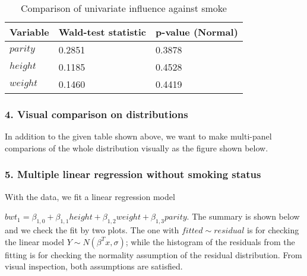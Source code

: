 \documentclass{article}
\begin{document}
\begin{table}
\caption{Comparison of univariate influence against smoke} \label{tab:title}
\begin{center}
\begin{tabular}{|l|l|l|}
Variable & Wald-test statistic & p-value (Normal) \\ \hline
{$parity$} & 0.2851 & 0.3878 \\ 
{$height$} & 0.1185 & 0.4528 \\ 
{$weight$} & 0.1460 & 0.4419 \\ 
\end{tabular}
\end{center}
\end{table}


\subsubsection*{4. Visual comparison on distributions}
\hspace{12 pt} In addition to the given table shown above, we want to
make multi-panel comparions of the whole distribution visually as the
figure shown below. 


\subsubsection*{5. Multiple linear regression without smoking status}
\hspace{12 pt} With the data, we fit a linear regression model


\hspace{24 pt}
$bwt_1 = \beta_{1,0} + \beta_{1,1}height + \beta_{1,2}weight + \beta_{1,3}parity$. \newline
The summary is shown below and we check the fit by two plots. The one
with $fitted \sim residual$ is for checking the linear model $Y \sim
N(\beta^Tx,\sigma)$; while the histogram of the residuals from the
fitting is for checking the normality assumption of the residual
distribution. From visual inspection, both assumptions are satisfied.
\end{document}
